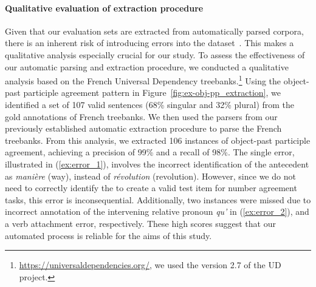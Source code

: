\paragraph{Qualitative evaluation of extraction procedure} 
Given that our evaluation sets are extracted from automatically parsed corpora, there is an inherent risk of introducing errors into the dataset~\citep{bender-etal-2011-parser}. This makes a qualitative analysis especially crucial for our study. To assess the effectiveness of our automatic parsing and extraction procedure, we conducted a qualitative analysis based on the French
Universal Dependency treebanks.\footnote{ \url{https://universaldependencies.org/}, we used the version 2.7 of the UD project.} Using the object-past participle agreement pattern in Figure~\ref{fig:ex-obj-pp_extraction}, we identified a set of 107 valid sentences (68\% singular and 32\% plural) from the gold annotations of French treebanks. We then used the parsers from our previously established automatic extraction procedure to parse the French treebanks. From this analysis, we extracted 106 instances of object-past participle agreement, achieving a precision of 99\% and a recall of 98\%. The single error, illustrated in (\ref{ex:error_1}), involves the incorrect identification of the antecedent as \textit{manière} (way), instead of \textit{révolution} (revolution). However, since we do not need to correctly identify the \cue to create a valid test item for number agreement tasks, this error is inconsequential. Additionally, two instances were missed due to incorrect annotation of the intervening relative pronoun \textit{qu'} in (\ref{ex:error_2}), and a verb attachment error, respectively. These high scores suggest that our automated process is reliable for the aims of this study.

